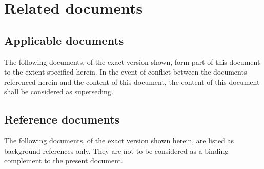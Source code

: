 \section{Related documents}
\label{sec:related_docs}

\subsection{Applicable documents}
\label{sec:applicable_docs}

The following documents, of the exact version shown, form part of this document to the extent specified herein. In the event of conflict between the documents referenced herein and the content of this document, the content of this document shall be considered as superseding.

\begin{ADlist}
\end{ADlist}


\subsection{Reference documents}
\label{sec:reference_docs}

The following documents, of the exact version shown herein, are listed as background references only. They are not to be considered as a binding complement to the present document.

\begin{RDlist}
\end{RDlist}

